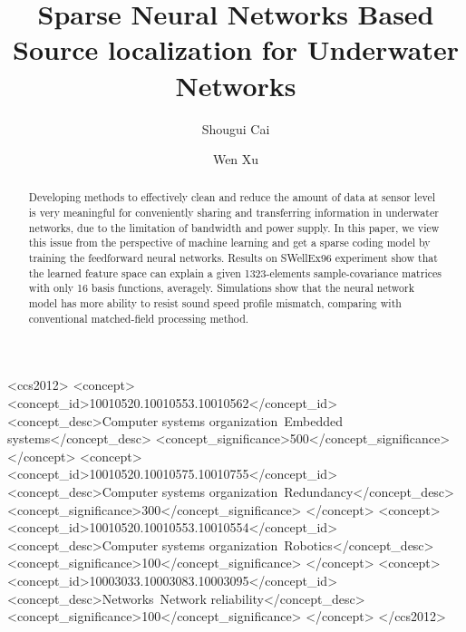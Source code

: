\documentclass[sigconf]{acmart}
\begin{document}
\title{
Sparse Neural Networks Based Source localization for Underwater Networks %
}
\author{Shougui Cai}

\author{Wen Xu}

\renewcommand{\shortauthors}{Shougui Cai.}


\begin{abstract}
Developing methods to effectively clean and reduce the amount of data at sensor level is very meaningful for conveniently sharing and transferring information in underwater networks, due to the limitation of bandwidth and power supply. In this paper, we view this issue from the perspective of machine learning
and get a sparse coding model by training the feedforward neural networks.
Results on SWellEx96 experiment show that the learned feature space can explain a given 1323-elements sample-covariance matrices with only 16 basis functions, averagely.
Simulations show that the neural network model has more ability to resist sound speed profile mismatch, comparing with conventional matched-field processing method.
\end{abstract}

%
%
\begin{CCSXML}
<ccs2012>
 <concept>
  <concept_id>10010520.10010553.10010562</concept_id>
  <concept_desc>Computer systems organization~Embedded systems</concept_desc>
  <concept_significance>500</concept_significance>
 </concept>
 <concept>
  <concept_id>10010520.10010575.10010755</concept_id>
  <concept_desc>Computer systems organization~Redundancy</concept_desc>
  <concept_significance>300</concept_significance>
 </concept>
 <concept>
  <concept_id>10010520.10010553.10010554</concept_id>
  <concept_desc>Computer systems organization~Robotics</concept_desc>
  <concept_significance>100</concept_significance>
 </concept>
 <concept>
  <concept_id>10003033.10003083.10003095</concept_id>
  <concept_desc>Networks~Network reliability</concept_desc>
  <concept_significance>100</concept_significance>
 </concept>
</ccs2012>
\end{CCSXML}
\end{document}
